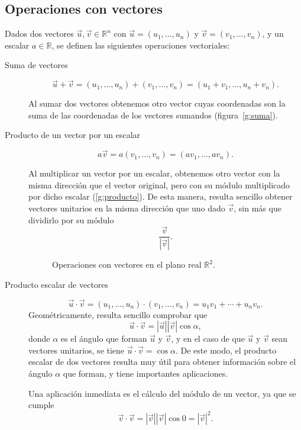 \documentclass[a4paper]{article}
\begin{document}
\subsection*{Operaciones con vectores}
Dados dos vectores $\vec{u},\vec{v}\in \mathbb{R}^n$ con
$\vec{u}=(u_1,\ldots,u_n)$ y $\vec{v}=(v_1,\ldots,v_n)$, y un escalar $a\in
\mathbb{R}$, se definen las siguientes operaciones vectoriales:
\begin{description}
\item [Suma de vectores]
\[
\vec{u}+\vec{v}=(u_1,\ldots,u_n)+(v_1,\ldots,v_n)=(u_1+v_1,\ldots,u_n+v_n).
\]

Al sumar dos vectores obtenemos otro vector cuyas coordenadas son la suma de las coordenadas de los vectores sumandos (figura~\ref{g:suma}).

\item [Producto de un vector por un escalar]
\[
a\vec{v}=a(v_1,\ldots,v_n)=(av_1,\ldots,av_n).
\]

Al multiplicar un vector por un escalar, obtenemos otro vector con la misma
dirección que el vector original, pero con su módulo multiplicado por dicho
escalar (\ref{g:producto}). De esta manera, resulta sencillo obtener vectores unitarios en la
misma dirección que uno dado $\vec{v}$, sin más que dividirlo por su módulo
\[\frac{\vec{v}}{|\vec{v}|}.\]

\begin{figure}[h!]
\centering {}\qquad
{}
\caption{Operaciones con vectores en el plano real $\mathbb{R}^2$.}
\end{figure}  

\item [Producto escalar de vectores]
\[
\vec{u}\cdot\vec{v}=(u_1,\ldots,u_n)\cdot(v_1,\ldots,v_n)=u_1v_1+\cdots+u_nv_n.
\]
Geométricamente, resulta sencillo comprobar que
\[
\vec{u}\cdot\vec{v}=|\vec{u}||\vec{v}|\cos\alpha, \] donde $\alpha$ es el
ángulo que forman $\vec{u}$ y $\vec{v}$, y en el caso de que $\vec{u}$ y
$\vec{v}$ sean vectores unitarios, se tiene $\vec{u}\cdot\vec{v}=\cos\alpha$.
De este modo, el producto escalar de dos vectores resulta muy útil para obtener
información sobre el ángulo $\alpha$ que forman, y tiene importantes
aplicaciones.

Una aplicación inmediata es el cálculo del módulo de un vector, ya que se
cumple
\[ \vec{v}\cdot\vec{v}=|\vec{v}||\vec{v}|\cos 0=|\vec{v}|^2.\]


\end{description}
\end{document}
